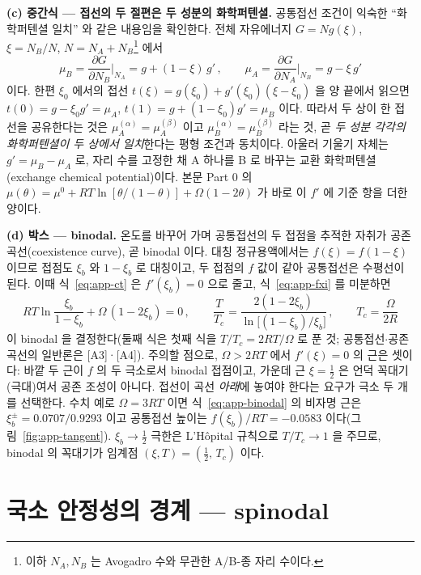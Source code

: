 \documentclass[11pt,a4paper]{article}
\begin{document}
\textbf{(c) 중간식 --- 접선의 두 절편은 두 성분의 화학퍼텐셜.} 공통접선 조건이 익숙한 ``화학퍼텐셜
일치'' 와 같은 내용임을 확인한다. 전체 자유에너지 $G=N g(\xi)$, $\xi=N_B/N$, $N=N_A+N_B$\footnote{이하
$N_A,N_B$ 는 Avogadro 수와 무관한 A/B-종 자리 수이다.} 에서
\begin{equation}
\mu_B=\frac{\partial G}{\partial N_B}\Big|_{N_A}=g+(1-\xi)\,g'\,,\qquad
\mu_A=\frac{\partial G}{\partial N_A}\Big|_{N_B}=g-\xi\,g'
\label{eq:app-mus}
\end{equation}
이다. 한편 $\xi_0$ 에서의 접선 $t(\xi)=g(\xi_0)+g'(\xi_0)(\xi-\xi_0)$ 을 양 끝에서 읽으면
$t(0)=g-\xi_0 g'=\mu_A$, $t(1)=g+(1-\xi_0)g'=\mu_B$ 이다. 따라서 두 상이 한 접선을 공유한다는 것은
$\mu_A^{(\alpha)}=\mu_A^{(\beta)}$ 이고 $\mu_B^{(\alpha)}=\mu_B^{(\beta)}$ 라는 것, 곧 \emph{두 성분
각각의 화학퍼텐셜이 두 상에서 일치}한다는 평형 조건과 동치이다. 아울러 기울기 자체는
$g'=\mu_B-\mu_A$ 로, 자리 수를 고정한 채 A 하나를 B 로 바꾸는 교환 화학퍼텐셜(exchange chemical
potential)이다. 본문 Part 0 의 $\mu(\theta)=\mu^0+RT\ln[\theta/(1-\theta)]+\Omega(1-2\theta)$ 가
바로 이 $f'$ 에 기준 항을 더한 양이다.

\textbf{(d) 박스 --- binodal.} 온도를 바꾸어 가며 공통접선의 두 접점을 추적한 자취가 공존
곡선(coexistence curve), 곧 binodal 이다. 대칭 정규용액에서는 $f(\xi)=f(1-\xi)$ 이므로 접점도
$\xi_b$ 와 $1-\xi_b$ 로 대칭이고, 두 접점의 $f$ 값이 같아 공통접선은 수평선이 된다. 이때
식~\eqref{eq:app-ct} 은 $f'(\xi_b)=0$ 으로 줄고, 식~\eqref{eq:app-fxi} 를 미분하면
\begin{equation}
\boxed{\;RT\ln\frac{\xi_b}{1-\xi_b}+\Omega\,(1-2\xi_b)=0\,,\qquad
\frac{T}{T_c}=\frac{2(1-2\xi_b)}{\ln\bigl[(1-\xi_b)/\xi_b\bigr]}\,,\qquad
T_c=\frac{\Omega}{2R}\;}
\label{eq:app-binodal}
\end{equation}
이 binodal 을 결정한다(둘째 식은 첫째 식을 $T/T_c=2RT/\Omega$ 로 푼 것; 공통접선$\cdot$공존 곡선의
일반론은 [A3]·[A4]). 주의할 점으로,
$\Omega>2RT$ 에서 $f'(\xi)=0$ 의 근은 셋이다: 바깥 두 근이 $f$ 의 두 극소로서 binodal 접점이고,
가운데 근 $\xi=\tfrac12$ 은 언덕 꼭대기(극대)여서 공존 조성이 아니다. 접선이 곡선 \emph{아래}에
놓여야 한다는 요구가 극소 두 개를 선택한다. 수치 예로 $\Omega=3RT$ 이면
식~\eqref{eq:app-binodal} 의 비자명 근은 $\xi_b^\pm=0.0707/0.9293$ 이고 공통접선 높이는
$f(\xi_b)/RT=-0.0583$ 이다(그림~\ref{fig:app-tangent}). $\xi_b\to\tfrac12$ 극한은 L'H\^opital
규칙으로 $T/T_c\to1$ 을 주므로, binodal 의 꼭대기가 임계점 $(\xi,T)=(\tfrac12,\,T_c)$ 이다.

\section{국소 안정성의 경계 --- spinodal}\label{app:spinodal}
\end{document}
